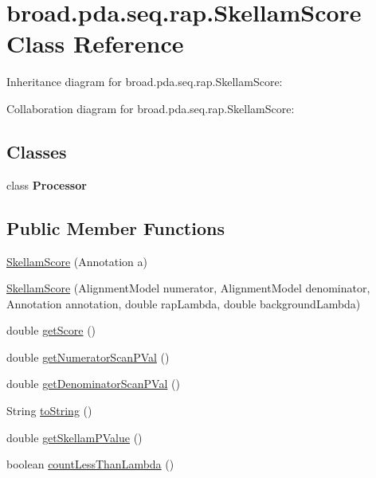 \hypertarget{classbroad_1_1pda_1_1seq_1_1rap_1_1_skellam_score}{\section{broad.\+pda.\+seq.\+rap.\+Skellam\+Score Class Reference}
\label{classbroad_1_1pda_1_1seq_1_1rap_1_1_skellam_score}
}


Inheritance diagram for broad.\+pda.\+seq.\+rap.\+Skellam\+Score\+:


Collaboration diagram for broad.\+pda.\+seq.\+rap.\+Skellam\+Score\+:
\subsection*{Classes}
\begin{DoxyCompactItemize}
\item 
class {\bfseries Processor}
\end{DoxyCompactItemize}
\subsection*{Public Member Functions}
\begin{DoxyCompactItemize}
\item 
\hyperlink{classbroad_1_1pda_1_1seq_1_1rap_1_1_skellam_score_a854b57e5d8393feaf92ac03276cbf138}{Skellam\+Score} (Annotation a)
\item 
\hyperlink{classbroad_1_1pda_1_1seq_1_1rap_1_1_skellam_score_a10a9ad5e4a20d7ad7efa4f3e012fd852}{Skellam\+Score} (Alignment\+Model numerator, Alignment\+Model denominator, Annotation annotation, double rap\+Lambda, double background\+Lambda)
\item 
double \hyperlink{classbroad_1_1pda_1_1seq_1_1rap_1_1_skellam_score_a4b26980b244bbb121634509a36c37905}{get\+Score} ()
\item 
double \hyperlink{classbroad_1_1pda_1_1seq_1_1rap_1_1_skellam_score_a7b931c83c7a5211fb236dddcb3a567f7}{get\+Numerator\+Scan\+P\+Val} ()
\item 
double \hyperlink{classbroad_1_1pda_1_1seq_1_1rap_1_1_skellam_score_a530e50d3eb5f0c690eafd388dfd8a529}{get\+Denominator\+Scan\+P\+Val} ()
\item 
String \hyperlink{classbroad_1_1pda_1_1seq_1_1rap_1_1_skellam_score_ab726031ed42e3fd921f8e3a001612d2d}{to\+String} ()
\item 
double \hyperlink{classbroad_1_1pda_1_1seq_1_1rap_1_1_skellam_score_ac5d4b9bc60ea6e9598830f76d210bcd3}{get\+Skellam\+P\+Value} ()
\item 
boolean \hyperlink{classbroad_1_1pda_1_1seq_1_1rap_1_1_skellam_score_a15e62e4b9eb28988d625c51ef448002c}{count\+Less\+Than\+Lambda} ()
\end{DoxyCompactItemize}



